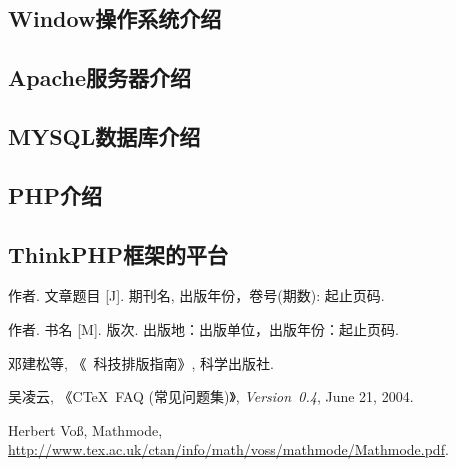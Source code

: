 \documentclass{xmuthesis}
\begin{document}
\begin{flushleft}
\subsection{Window操作系统介绍}
\subsection{Apache服务器介绍}
\subsection{MYSQL数据库介绍}
\subsection{PHP介绍}
\subsection{ThinkPHP框架的平台}
\backmatter



\clearpage{}
{}
\begin{thebibliography}{00}

   作者. 文章题目 [J].  期刊名, 出版年份，卷号(期数): 起止页码.

   作者. 书名 [M]. 版次. 出版地：出版单位，出版年份：起止页码.

   邓建松等, 《\LaTeXe~科技排版指南》, 科学出版社.

   吴凌云, 《CTeX~FAQ (常见问题集)》, \textit{Version~0.4}, June 21, 2004.

   Herbert Vo\ss, Mathmode, \url{http://www.tex.ac.uk/ctan/info/math/voss/mathmode/Mathmode.pdf}.


\end{thebibliography}


\appendix



\end{flushleft}
\end{document}
